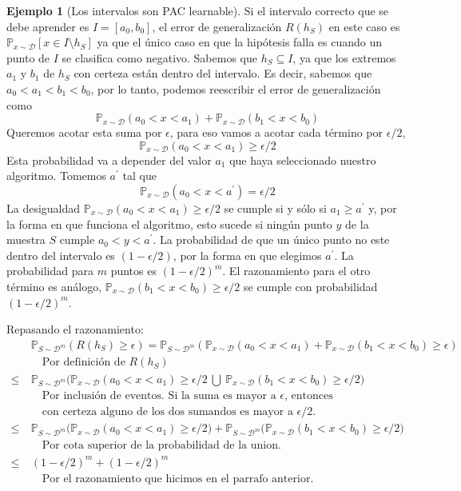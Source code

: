 \documentclass{article}
\theoremstyle{definition}
\newtheorem{example}{Ejemplo}%
\begin{document}
\begin{example}[Los intervalos son PAC learnable]
    Si el intervalo correcto que se debe aprender es $I = [a_0, b_0]$, el error de generalizaci\'on $R(h_S)$ en este caso es $\mathbb{P}_{x \sim \mathcal{D}}[x \in I \setminus h_S]$ ya que el \'unico caso en que la hip\'otesis falla es cuando un punto de $I$ se clasifica como negativo. 
    Sabemos que $h_S \subseteq I$, ya que los extremos $a_1$ y $b_1$ de $h_S$ con certeza est\'an dentro del intervalo. 
    Es decir, sabemos que $a_0 < a_1 < b_1 < b_0$, por lo tanto, podemos reescribir el error de generalizaci\'on como 
    $$\mathbb{P}_{x \sim \mathcal{D}}(a_0 < x < a_1) + \mathbb{P}_{x \sim \mathcal{D}}(b_1 < x < b_0)$$
    Queremos acotar esta suma por $\epsilon$, para eso vamos a acotar cada t\'ermino por $\epsilon/2$,
    $$\mathbb{P}_{x \sim \mathcal{D}}(a_0 < x < a_1) \geq \epsilon/2$$
    Esta probabilidad va a depender del valor $a_1$ que haya seleccionado nuestro algoritmo. Tomemos $a^\prime$ tal que 
    $$\mathbb{P}_{x \sim \mathcal{D}}(a_0 < x < a^\prime) = \epsilon/2$$
    La desigualdad $\mathbb{P}_{x \sim \mathcal{D}}(a_0 < x < a_1) \geq \epsilon/2$ se cumple si y s\'olo si $a_1 \geq a^\prime$ y, por la forma en que funciona el algoritmo, esto sucede si ning\'un punto $y$ de la muestra $S$ cumple $a_0 < y < a^\prime$. La probabilidad de que un \'unico punto no este dentro del intervalo es $(1 - \epsilon/2)$, por la forma en que elegimos $a^\prime$. La probabilidad para $m$ puntos es $(1 - \epsilon/2)^m$. El razonamiento para el otro t\'ermino es an\'alogo, $\mathbb{P}_{x \sim \mathcal{D}}(b_1 < x < b_0) \geq \epsilon/2$ se cumple con probabilidad $(1 - \epsilon/2)^m$. 
    
    Repasando el razonamiento:
    \begin{align*}
        & \mathbb{P}_{S\sim\mathcal{D}^m}(R(h_S) \geq \epsilon) = \mathbb{P}_{S\sim\mathcal{D}^m}( \mathbb{P}_{x \sim \mathcal{D}}(a_0 < x < a_1) + \mathbb{P}_{x \sim \mathcal{D}}(b_1 < x < b_0) \geq \epsilon) \\
        & \quad \text{Por definici\'on de } R(h_S) \\
        \leq\ & \mathbb{P}_{S\sim\mathcal{D}^m}\big(\mathbb{P}_{x \sim \mathcal{D}}(a_0 < x < a_1) \geq \epsilon/2 \ \bigcup \ \mathbb{P}_{x \sim \mathcal{D}}(b_1 < x < b_0) \geq \epsilon/2\big) \\
        & \quad \text{Por inclusi\'on de eventos. Si la suma es mayor a $\epsilon$, entonces} \\
        & \quad \text{con certeza alguno de los dos sumandos es mayor a $\epsilon/2$.} \\
        \leq\ & \mathbb{P}_{S\sim\mathcal{D}^m}\big(\mathbb{P}_{x \sim \mathcal{D}}(a_0 < x < a_1) \geq \epsilon/2 \big) + \mathbb{P}_{S\sim\mathcal{D}^m}\big(\mathbb{P}_{x \sim \mathcal{D}}(b_1 < x < b_0) \geq \epsilon/2\big) \\
        & \quad \text{Por cota superior de la probabilidad de la union.} \\
        \leq\ & (1-\epsilon/2)^m + (1-\epsilon/2)^m \\
        & \quad \text{Por el razonamiento que hicimos en el parrafo anterior.} \\
    \end{align*}


\end{example}
\end{document}
